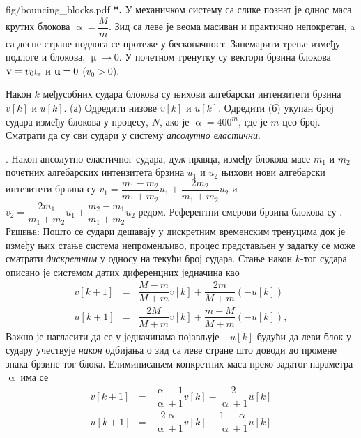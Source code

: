 \newpage
\begin{slikaDesno}{fig/bouncing_blocks.pdf}
\textbf{{\color{red}*}\ID.}
    У механичком систему са слике познат
је однос 
маса крутих блокова $
\upalpha = \dfrac{M}{m}$. 
Зид са леве је веома масиван и 
практично непокретан, a са десне стране подлога 
се протеже у бесконачност.
Занемарити трење између подлоге 
и блокова, 
$\upmu \to 0$. 
У почетном тренутку су вектори брзина 
блокова
${\bf v} = v_0 {\rm i}_x$ и
${\bf u} = 0$ ($v_0 > 0$). 
\end{slikaDesno}
Након $k$ међусобних судара блокова су 
њихови алгебарски интензитети брзина 
$v[k]$ и $u[k]$.
(а) Одредити низове $v[k]$ и $u[k]$.
Одредити (б) укупан
број судара између блокова у процесу, $N$, 
ако је $\upalpha = 400^m$, где је $m$ цео број.
Сматрати да су сви судари у систему 
\textit{апсолутно еластични}. 

\textit{}. Након 
апсолутно еластичног
судара, дуж правца, између блокова масе $m_1$ и $m_2$ 
почетних алгебарских интензитета брзина $u_1$ и 
$u_2$ њихови нови алгебарски интезитети брзина су 
$v_1 = \dfrac{m_1-m_2}{m_1+m_2} u_1 + 
\dfrac{2m_2}{m_1+m_2} u_2$  и 
$v_2 = 
\dfrac{2 m_1}{m_1+m_2} u_1
+
\dfrac{m_2 - m_1}{m_1 + m_2} u_2  
$ редом. Референтни смерови брзина блокова 
су . \\

\textsc{\underline{Решење}}: Пошто се судари дешавају у дискретним временским тренуцима 
док је између њих стање система непроменљиво, процес представљен у задатку се може сматрати
\textit{дискретним} у односу на текући број судара. Стање након $k$-тог судара описано је
системом датих диференцних једначина као 
\begin{eqnarray}
    v[k+1] & = & \dfrac{M - m}{M + m} v[k] + \dfrac{2m}{M + m} (-u[k]) \\[2mm]
    u[k+1] & = & \dfrac{2M}{M + m} v[k] + \dfrac{m - M}{M + m} (-u[k]),
\end{eqnarray} 
Важно је нагласити да се у једначинама појављује $-u[k]$ будући да леви блок у судару учествује 
\textit{након} одбијања о зид са леве стране што доводи до промене знака брзине тог блока. 
Елиминисањем конкретних маса преко задатог параметра $\upalpha$ има се
\begin{eqnarray}
    v[k+1] & = & \dfrac{\upalpha - 1}{\upalpha + 1} v[k] - \dfrac{2}{\upalpha + 1} u[k] \\[2mm]
    u[k+1] & = & \dfrac{2\upalpha}{\upalpha + 1} v[k] - \dfrac{1 - \upalpha}{\upalpha + 1} u[k]
\end{eqnarray} 

